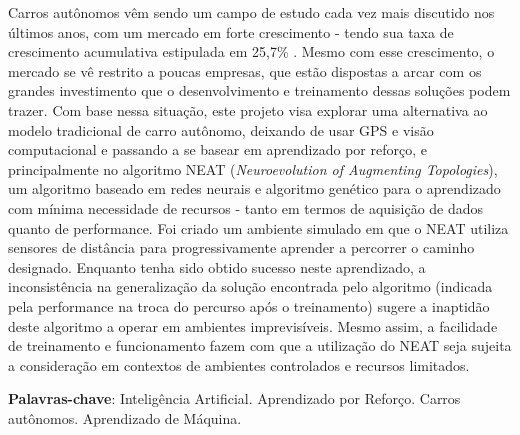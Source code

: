 \setlength{\absparsep}{18pt} %
\begin{resumo}
	Carros autônomos v{\^e}m sendo um campo de estudo cada vez mais discutido
	nos {\'u}ltimos anos, com um mercado em forte crescimento - tendo sua taxa
	de crescimento acumulativa estipulada em 25,7\% \cite{globe2022}. Mesmo com
	esse crescimento, o mercado se v{\^e} restrito a poucas empresas, que
	est{\~a}o dispostas a arcar com os grandes investimento que o
	desenvolvimento e treinamento dessas solu{\c c}{\~o}es podem trazer. Com
	base nessa situa{\c c}{\~a}o, este projeto visa explorar uma alternativa ao
	modelo tradicional de carro aut{\^o}nomo, deixando de usar GPS e vis{\~a}o
	computacional e passando a se basear em aprendizado por refor{\c c}o, e
	principalmente no algoritmo NEAT (\textit{Neuroevolution of Augmenting
	Topologies}), um algoritmo baseado em redes neurais e algoritmo
	gen{\'e}tico para o aprendizado com m{\'i}nima necessidade de recursos -
	tanto em termos de aquisi{\c c}{\~a}o de dados quanto de performance. Foi
	criado um ambiente simulado em que o NEAT utiliza sensores de
	dist{\^a}ncia para progressivamente aprender a percorrer o caminho
	designado. Enquanto tenha sido obtido sucesso neste aprendizado, a
	inconsist{\^e}ncia na generaliza{\c c}{\~a}o da solu{\c c}{\~a}o encontrada
	pelo algoritmo (indicada pela performance na troca do percurso ap{\'o}s o
	treinamento) sugere a inaptid{\~a}o deste algoritmo a operar em ambientes
	imprevis{\'i}veis. Mesmo assim, a facilidade de treinamento e funcionamento
	fazem com que a utiliza{\c c}{\~a}o do NEAT seja sujeita a considera{\c
	c}{\~a}o em contextos de ambientes controlados e recursos limitados.

	\textbf{Palavras-chave}: Intelig{\^e}ncia Artificial. Aprendizado por Refor{\c c}o. Carros aut{\^o}nomos. Aprendizado de M{\'a}quina.
\end{resumo}

